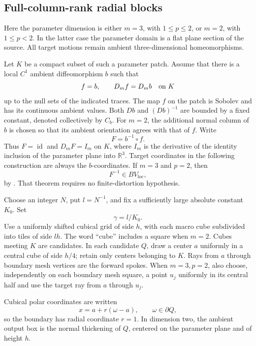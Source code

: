 \documentclass[11pt]{article}
\numberwithin{equation}{section}
\theoremstyle{definition}
\theoremstyle{remark}
\begin{document}
\subsection{Full-column-rank radial blocks}

Here the parameter dimension is either $m=3$, with $1\le p\le2$, or
$m=2$, with $1\le p<2$.  In the latter case the parameter domain is a
flat plane section of the source.  All target motions remain ambient
three-dimensional homeomorphisms.

Let $K$ be a compact subset of such a parameter patch.  Assume that
there is a local $C^1$ ambient diffeomorphism $b$ such that
\begin{equation}\label{la:identity-jets}
 f=b,\qquad D_m f=D_m b\quad\hbox{on }K
\end{equation}
up to the null sets of the indicated traces.  The map $f$ on the patch
is Sobolev and has its continuous ambient values.  Both $Db$ and
$(Db)^{-1}$ are bounded by a fixed constant, denoted collectively by
$C_b$.  For $m=2$, the additional normal column of $b$ is chosen so
that its ambient orientation agrees with that of $f$.
Write
\[
 F=b^{-1}\circ f.
\]
Thus $F=\operatorname{id}$ and $D_mF=I_m$ on $K$, where $I_m$ is the derivative
of the identity inclusion of the parameter plane into $\mathbb R^3$.
Target coordinates in the following construction are always the
$b$-coordinates.  If $m=3$ and $p=2$, then
\begin{equation}\label{la:inverse-bv}
 F^{-1}\in BV_{\mathrm{loc}},
\end{equation}
by \cite[Theorem~1.1]{CsornyeiHenclMaly2010}.  That theorem requires no
finite-distortion hypothesis.

Choose an integer $N$, put $l=N^{-1}$, and fix a sufficiently large
absolute constant $K_0$.  Set
\begin{equation}\label{la:gamma}
 \gamma=l/K_0.
\end{equation}
Use a uniformly shifted cubical grid of side $h$, with each macro cube
subdivided into tiles of side $lh$.  The word ``cube'' includes a
square when $m=2$.  Cubes meeting $K$ are candidates.  In each candidate
$Q$, draw a center $a$ uniformly in a central cube of side $h/4$; retain
only centers belonging to $K$.  Rays from $a$ through boundary mesh
vertices are the forward spokes.  When $m=3,p=2$, also choose,
independently on each boundary mesh square, a point $u_j$ uniformly in
its central half and use the target ray from $a$ through $u_j$.

Cubical polar coordinates are written
\[
 x=a+r(\omega-a),\qquad \omega\in\partial Q,
\]
so the boundary has radial coordinate $r=1$.  In dimension two, the
ambient output box is the normal thickening of $Q$, centered on the
parameter plane and of height $h$.
\end{document}
